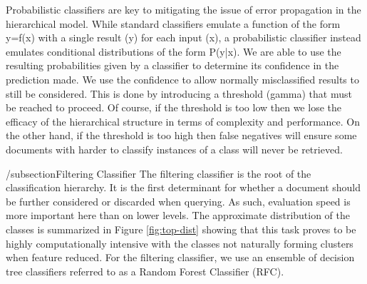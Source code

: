 Probabilistic classifiers are key to mitigating the issue of error propagation in the hierarchical model. While standard classifiers emulate a function of the form y=f(x) with a single result (y) for each input (x), a probabilistic classifier instead emulates conditional distributions of the form P(y|x). We are able to use the resulting probabilities given by a classifier to determine its confidence in the prediction made. We use the confidence to allow normally misclassified results to still be considered. This is done by introducing a threshold (gamma) that must be reached to proceed. Of course, if the threshold is too low then we lose the efficacy of the hierarchical structure in terms of complexity and performance. On the other hand, if the threshold is too high then false negatives will ensure some documents with harder to classify instances of a class will never be retrieved.


/subsection{Filtering Classifier}
The filtering classifier is the root of the classification hierarchy. It is the
first determinant for whether a document should be further considered or discarded when querying. As such, evaluation speed is more important here than on lower levels. The approximate distribution of the classes is summarized in Figure \ref{fig:top-dist} showing that this task proves to be highly computationally intensive with the classes not naturally forming clusters when feature reduced. For the filtering classifier, we use an ensemble of decision tree classifiers referred to as a Random Forest Classifier (RFC).

